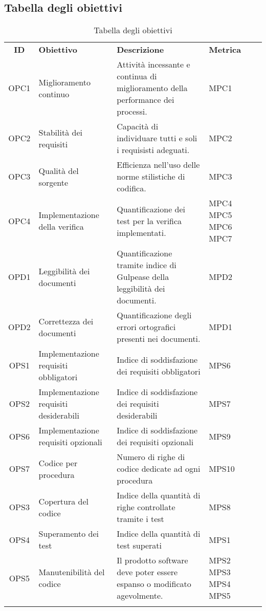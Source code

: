 \newpage
\subsection{Tabella degli obiettivi}

\begin{longtable}{| c | p{3cm} | p{5cm} | p{2cm} | p{3cm} |}
	\rowcolor{LightBlue}
	\color{white}\bfseries ID & \color{white}\bfseries Obiettivo & \color{white}\bfseries Descrizione & \color{white}\bfseries Metrica \\[0.25cm]
	OPC1 & Miglioramento continuo & Attività incessante e continua di miglioramento della performance dei processi. & MPC1\\ \hline
	\rowcolor{LightGray}
	OPC2 & Stabilità dei requisiti & Capacità di individuare tutti e soli i requisisti adeguati. & MPC2  \\ \hline
	OPC3 & Qualità del sorgente & Efficienza nell'uso delle norme stilistiche di codifica. & MPC3 \\ \hline
	\rowcolor{LightGray}
	OPC4 & Implementazione della verifica & Quantificazione dei test per la verifica implementati. & MPC4 \newline MPC5 \newline MPC6 \newline MPC7 \\ \hline
	OPD1 & Leggibilità dei documenti & Quantificazione tramite indice di Gulpease della leggibilità dei documenti. & MPD2 \\ \hline
	\rowcolor{LightGray}
	OPD2 & Correttezza dei documenti & Quantificazione degli errori ortografici presenti nei documenti. & MPD1  \\ \hline
	OPS1 & Implementazione requisiti obbligatori & Indice di soddisfazione dei requisiti obbligatori & MPS6 \\ \hline
	\rowcolor{LightGray}
	OPS2 & Implementazione requisiti desiderabili & Indice di soddisfazione dei requisiti desiderabili & MPS7 \\ \hline
	OPS6 & Implementazione requisiti opzionali & Indice di soddisfazione dei requisiti opzionali & MPS9 \\ \hline
	\rowcolor{LightGray}
	OPS7 & Codice per procedura & Numero di righe di codice dedicate ad ogni procedura & MPS10 \\ \hline
	OPS3 & Copertura del codice & Indice della quantità di righe controllate tramite i test & MPS8 \\ \hline
	\rowcolor{LightGray}
	OPS4 & Superamento dei test & Indice della quantità di test superati & MPS1 \\ \hline
	OPS5 & Manutenibilità del codice & Il prodotto software deve poter essere espanso o modificato agevolmente. & MPS2 \newline MPS3 \newline MPS4 \newline MPS5\\ \hline 
	\caption{Tabella degli obiettivi} 
\end{longtable}